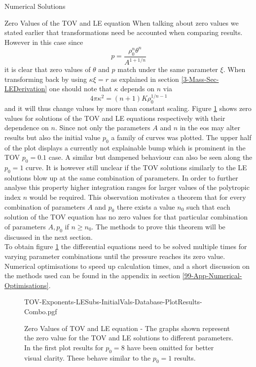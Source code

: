 \begin{section}{Numerical Solutions}
\begin{subsection}{Zero Values of the TOV and LE equation}
When talking about zero values we stated earlier that transformations need be accounted when comparing results.
However in this case since
\begin{equation}
	p=\frac{\rho_0^n\theta^n}{A^{1+1/n}}
\end{equation}
it is clear that zero values of $\theta$ and $p$ match under the same parameter $\xi$.
When transforming back by using $\kappa\xi=r$ as explained in section \ref{3-Mass-Sec-LEDerivation} one should note that $\kappa$ depends on $n$ via 
\begin{equation}
	4\pi\kappa^2=(n+1)K\rho_0^{1/n-1}
\end{equation}
and it will thus change values by more than constant scaling.
Figure \ref{4-NumSol-Plt-TOV-Exponents-Combo} shows zero values for solutions of the \ac{TOV} and \ac{LE} equations respectively with their dependence on $n$.
Since not only the parameters $A$ and $n$ in the \ac{eos} may alter results but also the initial value $p_0$ a family of curves was plotted.
The upper half of the plot displays a currently not explainable bump which is prominent in the \ac{TOV} $p_0=0.1$ case.
A similar but dampened behaviour can also be seen along the $p_0=1$ curve.
It is however still unclear if the \ac{TOV} solutions similarly to the \ac{LE} solutions blow up at the same combination of parameters.
In order to further analyse this property higher integration ranges for larger values of the polytropic index $n$ would be required.
This observation motivates a theorem that for every combination of parameters $A$ and $p_0$ there exists a value $n_0$ such that each solution of the TOV equation has no zero values for that particular combination of parameters $A,p_0$ if $n\geq n_0$.
The methods to prove this theorem will be discussed in the next section.\\
To obtain figure \ref{4-NumSol-Plt-TOV-Exponents-Combo} the differential equations need to be solved multiple times for varying parameter combinations until the pressure reaches its zero value.
Numerical optimisations to speed up calculation times, and a short discussion on the methods used can be found in the appendix in section \ref{99-App-Numerical-Optimisations}.
\begin{figure}[H]
	\centering
	{TOV-Exponents-LESubs-InitialVals-Database-PlotResults-Combo.pgf}
	\caption[Zero Values of TOV and LE equation]{Zero Values of \ac{TOV} and \ac{LE} equation - 
	The graphs shown represent the zero value for the \ac{TOV} and \ac{LE} solutions to different parameters.
	In the first plot results for $p_0=8$ have been omitted for better visual clarity.
	These behave similar to the $p_0=1$ results.
	}
	\label{4-NumSol-Plt-TOV-Exponents-Combo}
\end{figure}
\end{subsection}
%
%
\end{section}
